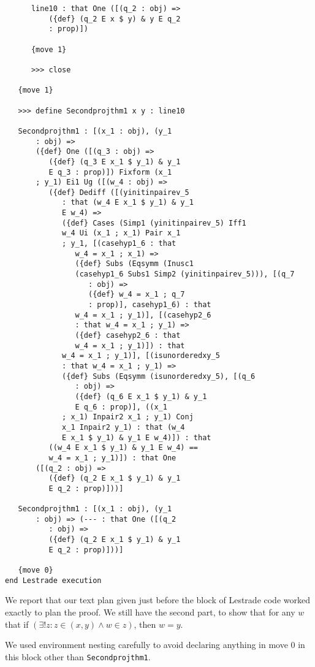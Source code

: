 \documentclass[12pt]{article}
\begin{document}
\begin{verbatim}
      line10 : that One ([(q_2 : obj) => 
          ({def} (q_2 E x $ y) & y E q_2 
          : prop)])

      {move 1}

      >>> close

   {move 1}

   >>> define Secondprojthm1 x y : line10

   Secondprojthm1 : [(x_1 : obj), (y_1 
       : obj) => 
       ({def} One ([(q_3 : obj) => 
          ({def} (q_3 E x_1 $ y_1) & y_1 
          E q_3 : prop)]) Fixform (x_1 
       ; y_1) Ei1 Ug ([(w_4 : obj) => 
          ({def} Dediff ([(yinitinpairev_5 
             : that (w_4 E x_1 $ y_1) & y_1 
             E w_4) => 
             ({def} Cases (Simp1 (yinitinpairev_5) Iff1 
             w_4 Ui (x_1 ; x_1) Pair x_1 
             ; y_1, [(casehyp1_6 : that 
                w_4 = x_1 ; x_1) => 
                ({def} Subs (Eqsymm (Inusc1 
                (casehyp1_6 Subs1 Simp2 (yinitinpairev_5))), [(q_7 
                   : obj) => 
                   ({def} w_4 = x_1 ; q_7 
                   : prop)], casehyp1_6) : that 
                w_4 = x_1 ; y_1)], [(casehyp2_6 
                : that w_4 = x_1 ; y_1) => 
                ({def} casehyp2_6 : that 
                w_4 = x_1 ; y_1)]) : that 
             w_4 = x_1 ; y_1)], [(isunorderedxy_5 
             : that w_4 = x_1 ; y_1) => 
             ({def} Subs (Eqsymm (isunorderedxy_5), [(q_6 
                : obj) => 
                ({def} (q_6 E x_1 $ y_1) & y_1 
                E q_6 : prop)], ((x_1 
             ; x_1) Inpair2 x_1 ; y_1) Conj 
             x_1 Inpair2 y_1) : that (w_4 
             E x_1 $ y_1) & y_1 E w_4)]) : that 
          ((w_4 E x_1 $ y_1) & y_1 E w_4) == 
          w_4 = x_1 ; y_1)]) : that One 
       ([(q_2 : obj) => 
          ({def} (q_2 E x_1 $ y_1) & y_1 
          E q_2 : prop)]))]

   Secondprojthm1 : [(x_1 : obj), (y_1 
       : obj) => (--- : that One ([(q_2 
          : obj) => 
          ({def} (q_2 E x_1 $ y_1) & y_1 
          E q_2 : prop)]))]

   {move 0}
end Lestrade execution
\end{verbatim}

We report that our text plan given just before the block of Lestrade code worked exactly to plan the proof.  We still have the second part, to show that for any $w$ that if $(\exists! z: z \in (x,y) \wedge w \in z)$, then $w=y$.

We used environment nesting carefully to avoid declaring anything in move 0 in this block other than {\tt Secondprojthm1}.
\end{document}

